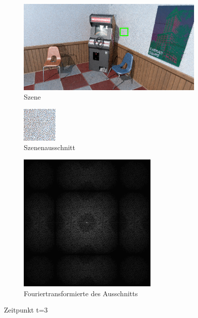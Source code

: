 \begin{figure}[H]
    \begin{subfigure}{\textwidth}
        \centering \includegraphics[scale=.25]{content/TemporalerAlg/Bilder/Retargeting/Szene/Szene3.png}
        \caption{Szene}
        \label{fig:Retargeting_And_Sorting_Szene_t3}
    \end{subfigure}
    \begin{subfigure}{0.5\textwidth}
        \centering\includegraphics[width=0.4\linewidth]{content/TemporalerAlg/Bilder/Retargeting/Ausschnitt/Ausschnitt3.png} 
        \caption{Szenenausschnitt}
        \label{fig:Retargeting_And_Sorting_ausschnitt_t3}
    \end{subfigure}
    \begin{subfigure}{0.5\textwidth}
        \centering\includegraphics[width=0.4\linewidth]{content/TemporalerAlg/Bilder/Retargeting/Spektren/Ausschnitt3.png}
        \caption{Fouriertransformierte des Ausschnitts}
        \label{fig:Retargeting_And_Sorting_Fouriertransformierte_t3}
    \end{subfigure}
        \caption{Zeitpunkt t=3}
        \label{fig:Retargeting_And_Sorting_Verlauf_t3}
\end{figure}


